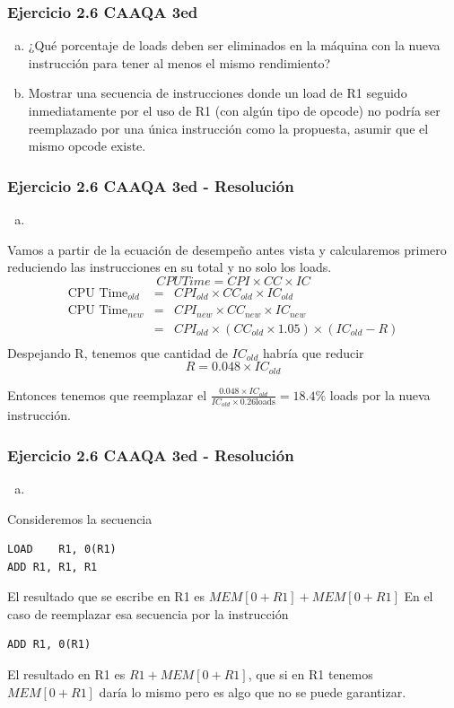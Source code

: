\documentclass{beamer}
\begin{document}
\begin{frame}
 \frametitle{Ejercicio 2.6 CAAQA 3ed}
\begin{enumerate}[a.]
\item ¿Qué porcentaje de loads deben ser eliminados en la máquina con la nueva instrucción para tener al menos el mismo rendimiento?
\item Mostrar una secuencia de instrucciones donde un load de R1 seguido inmediatamente por el uso de R1 (con algún tipo de opcode) no podría ser reemplazado por una única instrucción como la propuesta, asumir que el mismo opcode existe.  
\end{enumerate}
\end{frame}

\begin{frame}
 \frametitle{Ejercicio 2.6 CAAQA 3ed - Resolución}
\begin{enumerate}[a.]
\item
\end{enumerate}
Vamos a partir de la ecuación de desempeño antes vista y calcularemos primero reduciendo las instrucciones en su total y no solo los loads. 
\[ CPU Time = CPI \times CC \times IC \]
\begin{eqnarray*}
\text{CPU Time}_{old} &=& CPI_{old} \times CC_{old} \times IC_{old} \\
\text{CPU Time}_{new} &=& CPI_{new} \times CC_{new} \times IC_{new} \\
&=& CPI_{old} \times (CC_{old} \times 1.05) \times (IC_{old} - R) \\
\end{eqnarray*}
Despejando R, tenemos que cantidad de $IC_{old}$ habría que reducir
\[R = 0.048 \times IC_{old} \]

Entonces tenemos que reemplazar el $\frac{0.048 \times IC_{old}}{IC_{old} \times 0.26 \text{loads} }= 18.4\% $ loads por la nueva instrucción.

\end{frame}

\begin{frame}[fragile]
 \frametitle{Ejercicio 2.6 CAAQA 3ed - Resolución}
\begin{enumerate}[b.]
\item
\end{enumerate}
Consideremos la secuencia
\begin{lstlisting}
LOAD 	R1, 0(R1)
ADD	R1, R1, R1
\end{lstlisting}
El resultado que se escribe en R1 es $MEM[0 + R1] + MEM[0 + R1]$
En el caso de reemplazar esa secuencia por la instrucción
\begin{lstlisting}
ADD	R1, 0(R1)
\end{lstlisting}

El resultado en R1 es $R1 + MEM[0 + R1]$, que si en R1 tenemos  $MEM[0 + R1]$ daría lo mismo pero es algo que no se puede garantizar.
\end{frame}
\end{document}
